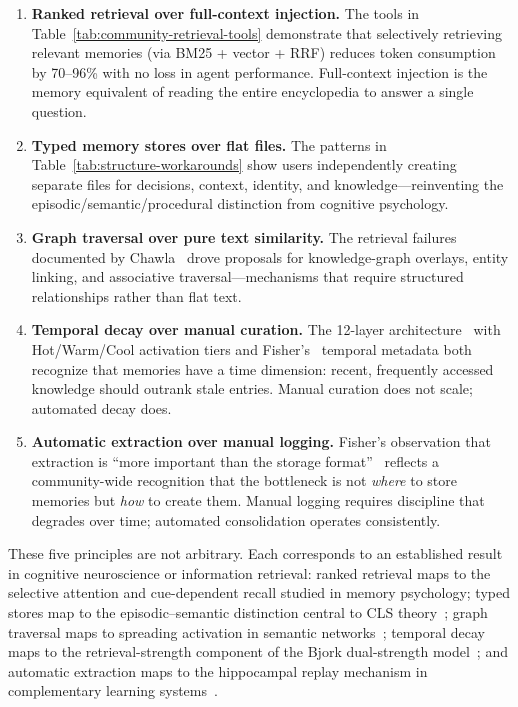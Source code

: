 \begin{enumerate}[leftmargin=*, nosep]
    \item \textbf{Ranked retrieval over full-context injection.}  The
    tools in Table~\ref{tab:community-retrieval-tools} demonstrate that
    selectively retrieving relevant memories (via BM25 + vector + RRF)
    reduces token consumption by 70--96\% with no loss in agent
    performance.  Full-context injection is the memory equivalent of
    reading the entire encyclopedia to answer a single question.

    \item \textbf{Typed memory stores over flat files.}  The patterns
    in Table~\ref{tab:structure-workarounds} show users independently
    creating separate files for decisions, context, identity, and
    knowledge---reinventing the episodic/semantic/procedural distinction
    from cognitive psychology.

    \item \textbf{Graph traversal over pure text similarity.}  The
    retrieval failures documented by Chawla~\cite{chawla2026} drove
    proposals for knowledge-graph overlays, entity linking, and
    associative traversal---mechanisms that require structured
    relationships rather than flat text.

    \item \textbf{Temporal decay over manual curation.}  The 12-layer
    architecture~\cite{coolmanns2026} with Hot/Warm/Cool activation
    tiers and Fisher's~\cite{fisher2026} temporal metadata both
    recognize that memories have a time dimension: recent, frequently
    accessed knowledge should outrank stale entries.  Manual curation
    does not scale; automated decay does.

    \item \textbf{Automatic extraction over manual logging.}  Fisher's
    observation that extraction is ``more important than the storage
    format''~\cite{fisher2026} reflects a community-wide recognition
    that the bottleneck is not \emph{where} to store memories but
    \emph{how} to create them.  Manual logging requires discipline that
    degrades over time; automated consolidation operates consistently.
\end{enumerate}

These five principles are not arbitrary.  Each corresponds to an
established result in cognitive neuroscience or information retrieval:
ranked retrieval maps to the selective attention and cue-dependent
recall studied in memory psychology; typed stores map to the
episodic--semantic distinction central to CLS
theory~\cite{mcclelland1995}; graph traversal maps to spreading
activation in semantic networks~\cite{collins1975}; temporal decay
maps to the retrieval-strength component of the Bjork dual-strength
model~\cite{bjork1992}; and automatic extraction maps to the
hippocampal replay mechanism in complementary learning
systems~\cite{mcclelland1995}.

